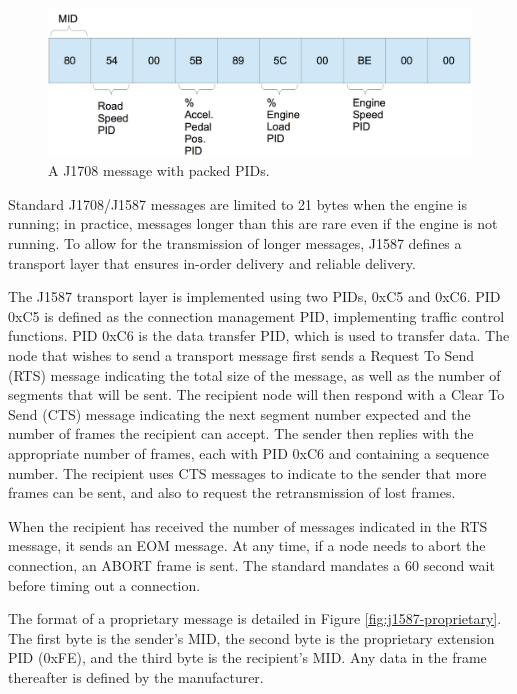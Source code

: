 \begin{figure}[h]
  \centering
  \includegraphics[scale=0.6]{PackedPIDs}
  \caption{A J1708 message with packed PIDs.}
  \label{fig:packedpids}
\end{figure}


Standard J1708/J1587 messages are limited to 21 bytes when the engine is running; in practice, messages longer than this are rare even if the engine
is not running. To allow for the transmission of longer messages, J1587 defines a transport layer that ensures in-order delivery and reliable delivery.

The J1587 transport layer is implemented using two PIDs, 0xC5 and 0xC6. PID 0xC5 is defined as the connection management PID, implementing traffic control
functions. PID 0xC6 is the data transfer PID, which is used to transfer data. The node that wishes to send a transport message first sends a Request To Send
(RTS) message indicating the total size of the message, as well as the number of segments that will be sent. The recipient node will then respond with a 
Clear To Send (CTS) message indicating the next segment number expected and the number of frames the recipient can accept. The sender then replies with
the appropriate number of frames, each with PID 0xC6 and containing a sequence number. The recipient uses CTS messages to indicate to the sender that
more frames can be sent, and also to request the retransmission of lost frames.

When the recipient has received the number of messages indicated in the RTS message, it sends an EOM message. At any time, if a node needs to abort the
connection, an ABORT frame is sent. The standard mandates a 60 second wait before timing out a connection.

The format of a proprietary message is detailed in Figure \ref{fig:j1587-proprietary}. The first byte is the sender's MID, the second byte is the
proprietary extension PID (0xFE), and the third byte is the recipient's MID. Any data in the frame thereafter is defined by the manufacturer.

